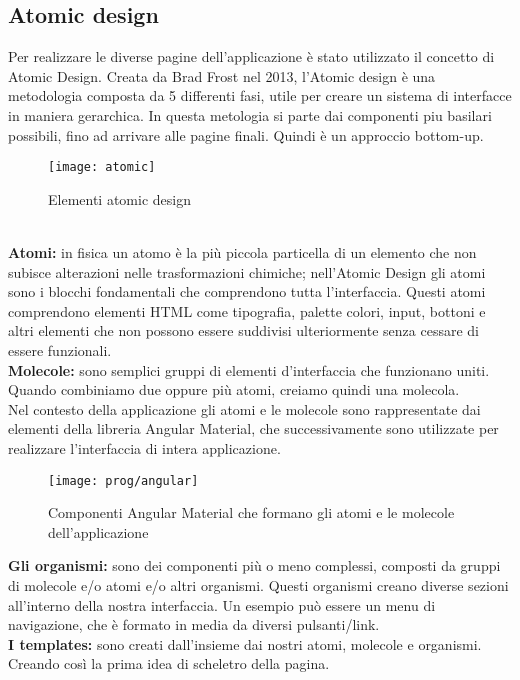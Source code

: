 \subsection{Atomic design}
Per realizzare le diverse pagine dell'applicazione è stato utilizzato il concetto di Atomic Design.
Creata da Brad Frost nel 2013, l'Atomic design è una metodologia composta da 5 differenti fasi, utile per creare un sistema di interfacce in maniera gerarchica. In questa metologia si parte dai componenti piu basilari possibili, fino ad arrivare alle pagine finali. Quindi è un approccio bottom-up.
\begin{figure}[!h] 
	\centering 
	\texttt{[image: atomic]} 
	\caption{Elementi atomic design}
\end{figure}
\\

\textbf{Atomi:} in fisica un atomo è la più piccola particella di un elemento che non subisce alterazioni nelle trasformazioni chimiche; nell’Atomic Design gli atomi sono i blocchi fondamentali che comprendono tutta l’interfaccia.
Questi atomi comprendono elementi HTML come tipografia, palette colori, input, bottoni e altri elementi che non possono essere suddivisi ulteriormente senza cessare di essere funzionali.
\\

\textbf{Molecole:} sono semplici gruppi di elementi d'interfaccia che funzionano uniti. Quando combiniamo due oppure più atomi, creiamo quindi una molecola.
\\

Nel contesto della applicazione gli atomi e le molecole sono rappresentate dai elementi della libreria Angular Material, che successivamente sono utilizzate per realizzare l'interfaccia di intera applicazione.

\begin{figure}[!h] 
	\centering 
	\texttt{[image: prog/angular]} 
	\caption{Componenti Angular Material che formano gli atomi e le molecole dell'applicazione}
\end{figure} 

\textbf{Gli organismi:} sono dei componenti più o meno complessi, composti da gruppi di molecole e/o atomi e/o altri organismi. Questi organismi creano diverse sezioni all'interno della nostra interfaccia. Un esempio può essere un menu di navigazione, che è formato in media da diversi pulsanti/link. 
\\

\textbf{I templates:} sono creati dall'insieme dai nostri atomi, molecole e organismi. Creando così la prima idea di scheletro della pagina.
\\

